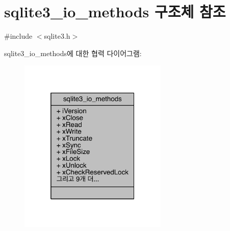 \hypertarget{structsqlite3__io__methods}{}\section{sqlite3\+\_\+io\+\_\+methods 구조체 참조}
\label{structsqlite3__io__methods}


{\ttfamily \#include $<$sqlite3.\+h$>$}



sqlite3\+\_\+io\+\_\+methods에 대한 협력 다이어그램\+:
\nopagebreak
\begin{figure}[H]
\begin{center}
\leavevmode
\includegraphics[width=200pt]{d6/d10/structsqlite3__io__methods__coll__graph}
\end{center}
\end{figure}
